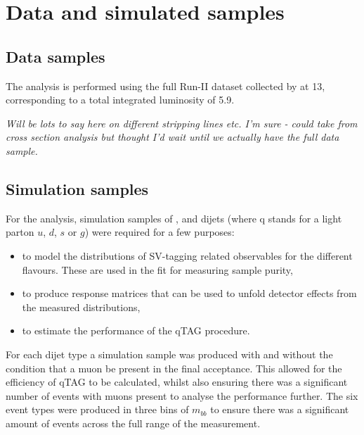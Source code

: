 \section{Data and simulated samples} \label{sec:samples}

\subsection{Data samples}
The analysis is performed using the full Run-II dataset collected by \lhcb at 13\tev, corresponding to a total integrated luminosity of 5.9\invfb. 

\textit{Will be lots to say here on different stripping lines etc. I'm sure - could take from cross section analysis but thought I'd wait until we actually have the full data sample.
}
\subsection{Simulation samples}
For the analysis, simulation samples of \bbbar, \ccbar and \qqbar dijets (where q stands for a light parton $u$, $d$, $s$ or $g$) were required for a few purposes:
\begin{itemize}
    \item to model the distributions of SV-tagging related observables for the different flavours. These are used in the fit for measuring sample purity,
    \item to produce response matrices that can be used to unfold detector effects from the measured distributions,
    \item to estimate the performance of the qTAG procedure.
\end{itemize}
For each dijet type a simulation sample was produced with and without the condition that a muon be present in the final \lhcb acceptance. This allowed for the efficiency of qTAG to be calculated, whilst also ensuring there was a significant number of events with muons present to analyse the performance further. The six event types were produced in three bins of $m_{bb}$ to ensure there was a significant amount of events across the full range of the measurement.